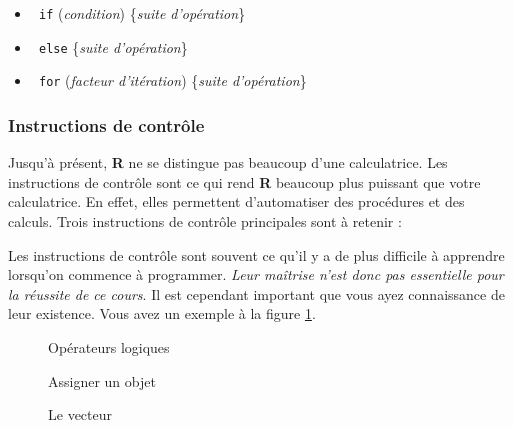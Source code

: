 \documentclass[10.5pt,a4paper]{article}
\newcommand{\rcode}[1]{\texttt{\color{rstudio} #1}}
\begin{document}
       \begin{itemize}
      \item \rcode{if} (\emph{condition}) \{\emph{suite d'opération}\}
      \item \rcode{else} \{\emph{suite d'opération}\}
      \item \rcode{for} (\emph{facteur d'itération}) \{\emph{suite d'opération}\}
    \end{itemize}
     
    \subsubsection{Instructions de contrôle}
  Jusqu'à présent, \textbf{R} ne se distingue pas beaucoup d'une calculatrice. Les instructions de contrôle sont ce qui rend \textbf{R} beaucoup plus puissant que votre calculatrice. En effet, elles permettent d'automatiser des procédures et des calculs. Trois instructions de contrôle principales sont à retenir :
    
    Les instructions de contrôle sont souvent ce qu'il y a de plus difficile à apprendre lorsqu'on commence à programmer. \emph{Leur maîtrise n'est donc pas essentielle pour la réussite de ce cours}. Il est cependant important que vous ayez connaissance de leur existence. Vous avez un exemple à la figure \ref{opeLogi}. %
    
    
    \begin{figure}[H]
    \centering
    \caption{Opérateurs logiques}
    \label{opeLogi}
    \end{figure}
    
    \begin{figure}[H]
    \centering
    \caption{Assigner un objet}
    \label{struObj}
    \end{figure}
    
    \begin{figure}[H]
    \centering
    \caption{Le vecteur}
    \label{struVec1}
    \end{figure}
  
\end{document}

